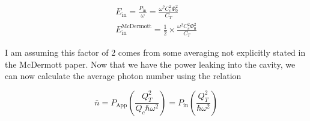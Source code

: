 \documentclass[12pt,reqno]{amsart}
\begin{document}
\begin{eqnarray}
E_\text{in} = \frac{P_\text{in}}{\omega} = \frac{\omega^2 C_c^2 \Phi_0^2}{C_T} \\
E_\text{in}^\text{McDermott} = \frac{1}{2} \times \frac{\omega^2 C_c^2 \Phi_0^2}{C_T}
\end{eqnarray}

I am assuming this factor of 2 comes from some averaging not explicitly stated in the McDermott paper. Now that we have the power leaking into the cavity, we can now calculate the average photon number using the relation

\begin{equation}
\bar{n} = P_\text{App}\left(\frac{Q_T^2}{Q_c \hbar \omega^2}\right) = P_\text{in}  \left(\frac{Q_T^2}{\hbar \omega^2} \right)
\end{equation}
\end{document}
